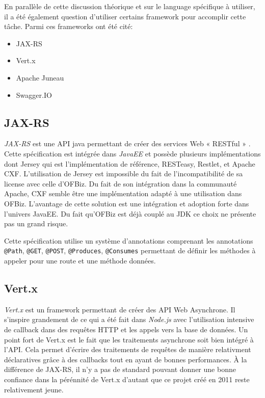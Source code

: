 \documentclass[a4paper, 11pt]{report}
\begin{document}
En parallèle de cette discussion théorique et sur le language
spécifique à utiliser, il a été également question d'utiliser certains
framework pour accomplir cette tâche. Parmi ces frameworks ont été
cité:

\begin{itemize}
\item JAX-RS
\item Vert.x
\item Apache Juneau
\item Swagger.IO
\end{itemize}

\subsection{JAX-RS}

\emph{JAX-RS} est une API java permettant de créer des services Web «
RESTful » \cite{pericas2013jax}. Cette spécification est intégrée dans
\emph{JavaEE} et possède plusieurs implémentations dont Jersey qui est
l'implémentation de référence, RESTeasy, Restlet, et Apache CXF.
L'utilisation de Jersey est impossible du fait de l'incompatibilité de
sa license avec celle d'OFBiz.  Du fait de son intégration dans la
communauté Apache, CXF semble être une implémentation adapté à une
utilisation dans OFBiz.  L'avantage de cette solution est une
intégration et adoption forte dans l'univers JavaEE.  Du fait qu'OFBiz
est déjà couplé au JDK ce choix ne présente pas un grand risque.

Cette spécification utilise un système d'annotations comprenant les
annotations \verb=@Path=, \verb=@GET=, \verb=@POST=, \verb=@Produces=,
\verb=@Consumes= permettant de définir les méthodes à appeler pour une
route et une méthode données.

\subsection{Vert.x}

\emph{Vert.x} est un framework permettant de créer des API Web
Asynchrone.  Il s'inspire grandement de ce qui a été fait dans
\emph{Node.js} avec l'utilisation intensive de callback dans des
requêtes HTTP et les appels vers la base de données. Un point fort de
Vert.x est le fait que les traitements asynchrone soit bien intégré à
l'API. Cela permet d'écrire des traitements de requêtes de manière
relativment déclaratives grâce à des callbacks tout en ayant de bonnes
performances.  À la différence de JAX-RS, il n'y a pas de standard
pouvant donner une bonne confiance dans la pérénnité de Vert.x
d'autant que ce projet créé en 2011 reste relativement jeune.
\end{document}
